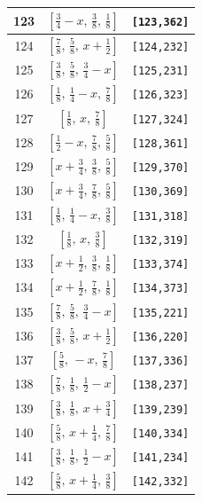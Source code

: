 \documentclass[fleqn,8pt]{jsarticle}
\begin{document}
\begin{longtable}{ccc}
123 & $\left[ \frac{3}{4} - x,\, \frac{3}{8},\, \frac{1}{8} \right]$ & {\tt [123,362]} \\ \hline
124 & $\left[ \frac{7}{8},\, \frac{5}{8},\, x + \frac{1}{2} \right]$ & {\tt [124,232]} \\ \hline
125 & $\left[ \frac{3}{8},\, \frac{5}{8},\, \frac{3}{4} - x \right]$ & {\tt [125,231]} \\ \hline
126 & $\left[ \frac{1}{8},\, \frac{1}{4} - x,\, \frac{7}{8} \right]$ & {\tt [126,323]} \\ \hline
127 & $\left[ \frac{1}{8},\, x,\, \frac{7}{8} \right]$ & {\tt [127,324]} \\ \hline
128 & $\left[ \frac{1}{2} - x,\, \frac{7}{8},\, \frac{5}{8} \right]$ & {\tt [128,361]} \\ \hline
129 & $\left[ x + \frac{3}{4},\, \frac{3}{8},\, \frac{5}{8} \right]$ & {\tt [129,370]} \\ \hline
130 & $\left[ x + \frac{3}{4},\, \frac{7}{8},\, \frac{5}{8} \right]$ & {\tt [130,369]} \\ \hline
131 & $\left[ \frac{1}{8},\, \frac{1}{4} - x,\, \frac{3}{8} \right]$ & {\tt [131,318]} \\ \hline
132 & $\left[ \frac{1}{8},\, x,\, \frac{3}{8} \right]$ & {\tt [132,319]} \\ \hline
133 & $\left[ x + \frac{1}{2},\, \frac{3}{8},\, \frac{1}{8} \right]$ & {\tt [133,374]} \\ \hline
134 & $\left[ x + \frac{1}{2},\, \frac{7}{8},\, \frac{1}{8} \right]$ & {\tt [134,373]} \\ \hline
135 & $\left[ \frac{7}{8},\, \frac{5}{8},\, \frac{3}{4} - x \right]$ & {\tt [135,221]} \\ \hline
136 & $\left[ \frac{3}{8},\, \frac{5}{8},\, x + \frac{1}{2} \right]$ & {\tt [136,220]} \\ \hline
137 & $\left[ \frac{5}{8},\, - x,\, \frac{7}{8} \right]$ & {\tt [137,336]} \\ \hline
138 & $\left[ \frac{7}{8},\, \frac{1}{8},\, \frac{1}{2} - x \right]$ & {\tt [138,237]} \\ \hline
139 & $\left[ \frac{3}{8},\, \frac{1}{8},\, x + \frac{3}{4} \right]$ & {\tt [139,239]} \\ \hline
140 & $\left[ \frac{5}{8},\, x + \frac{1}{4},\, \frac{7}{8} \right]$ & {\tt [140,334]} \\ \hline
141 & $\left[ \frac{3}{8},\, \frac{1}{8},\, \frac{1}{2} - x \right]$ & {\tt [141,234]} \\ \hline
142 & $\left[ \frac{5}{8},\, x + \frac{1}{4},\, \frac{3}{8} \right]$ & {\tt [142,332]} \\ \hline

\end{longtable}
\end{document}
